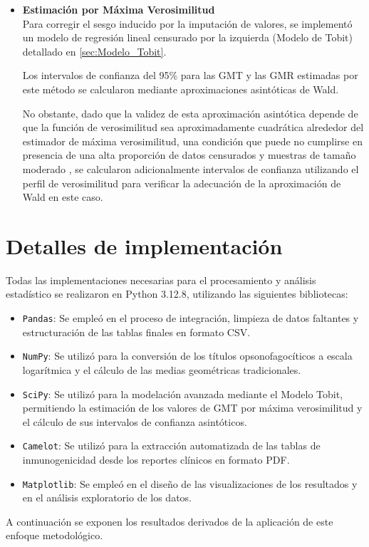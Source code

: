 \begin{itemize}
	\FloatBarrier
	
	\item \textbf{Estimación por Máxima Verosimilitud}\\
	
	Para corregir el sesgo inducido por la imputación de valores, se implementó un modelo de regresión lineal censurado por la izquierda (Modelo de Tobit) detallado en \ref{sec:Modelo_Tobit}.
	
	Los intervalos de confianza del 95\% para las GMT y las GMR estimadas por este método se calcularon mediante aproximaciones asintóticas de Wald.
	
	No obstante, dado que la validez de esta aproximación asintótica depende de que la función de verosimilitud sea aproximadamente cuadrática alrededor del estimador de máxima verosimilitud, una condición que puede no cumplirse en presencia de una alta proporción de datos censurados y muestras de tamaño moderado \cite{pawitan2001all}, se calcularon adicionalmente intervalos de confianza utilizando el perfil de verosimilitud \cite{venzon1988method} para verificar la adecuación de la aproximación de Wald en este caso.
	
\end{itemize}

\section{Detalles de implementación}

Todas las implementaciones necesarias para el procesamiento y análisis estadístico se realizaron en Python 3.12.8, utilizando las siguientes bibliotecas:

\begin{itemize}
	\item \texttt{Pandas}: Se empleó en el proceso de integración, limpieza de datos faltantes y estructuración de las tablas finales en formato CSV.
	\item \texttt{NumPy}: Se utilizó para la conversión de los títulos opsonofagocíticos a escala logarítmica y el cálculo de las medias geométricas tradicionales.
	\item \texttt{SciPy}: Se utilizó para la modelación avanzada mediante el Modelo Tobit, permitiendo la estimación de los valores de GMT por máxima verosimilitud y el cálculo de sus intervalos de confianza asintóticos.
	\item \texttt{Camelot}: Se utilizó para la extracción automatizada de las tablas de inmunogenicidad desde los reportes clínicos en formato PDF.
	\item \texttt{Matplotlib}: Se empleó en el diseño de las visualizaciones de los resultados y en el análisis exploratorio de los datos.
\end{itemize}

A continuación se exponen los resultados derivados de la aplicación de este enfoque metodológico.
